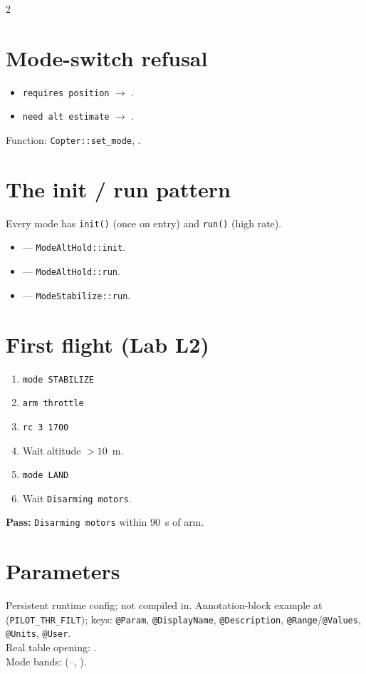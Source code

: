 \documentclass[a4paper,9pt,landscape]{extarticle}
\begin{document}
\begin{multicols*}{2}
\section*{Mode-switch refusal}
\begin{itemize}
  \item \texttt{requires position} $\rightarrow$ .
  \item \texttt{need alt estimate} $\rightarrow$ .
\end{itemize}
Function: \texttt{Copter::set\_mode}, .

\section*{The init / run pattern}
Every mode has \texttt{init()} (once on entry) and \texttt{run()} (high rate).
\begin{itemize}
  \item {} --- \texttt{ModeAltHold::init}.
  \item {} --- \texttt{ModeAltHold::run}.
  \item {} --- \texttt{ModeStabilize::run}.
\end{itemize}

\section*{First flight (Lab L2)}
\begin{enumerate}
  \item \texttt{mode STABILIZE}
  \item \texttt{arm throttle}
  \item \texttt{rc 3 1700}
  \item Wait altitude $> 10$~m.
  \item \texttt{mode LAND}
  \item Wait \texttt{Disarming motors}.
\end{enumerate}
\textbf{Pass:} \texttt{Disarming motors} within 90~s of arm.

\section*{Parameters}
Persistent runtime config; not compiled in. Annotation-block example at  (\texttt{PILOT\_THR\_FILT}); keys: \texttt{@Param}, \texttt{@DisplayName}, \texttt{@Description}, \texttt{@Range}/\texttt{@Values}, \texttt{@Units}, \texttt{@User}.\\
Real table opening: .\\
Mode bands:  (--, ).


\end{multicols*}
\end{document}
